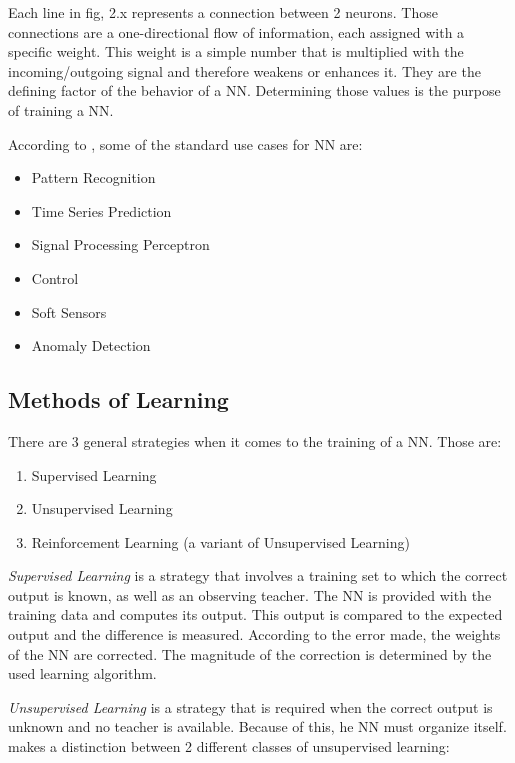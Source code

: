 Each line in fig, 2.x represents a connection between 2 neurons. Those connections are a one-directional flow of information, each assigned with a specific weight. This weight is a simple number that is multiplied with the incoming/outgoing signal and therefore weakens or enhances it. They are the defining factor of the behavior of a NN. Determining those values is the purpose of training a NN\cite{Bourg04}.

According to \cite{Shiffman12}, some of the standard use cases for NN are:

\begin{itemize}
	\item Pattern Recognition
	\item Time Series Prediction
	\item Signal Processing Perceptron
	\item Control
	\item Soft Sensors
	\item Anomaly Detection
\end{itemize}


\subsection{Methods of Learning}
There are 3 general strategies when it comes to the training of a NN\cite{Bourg04}. Those are:

\begin{enumerate}
	\item Supervised Learning
	\item Unsupervised Learning
	\item Reinforcement Learning (a variant of Unsupervised Learning\cite{Rojas96})
\end{enumerate}

\emph{Supervised Learning} is a strategy that involves a training set to which the correct output is known, as well as an observing teacher. The NN is provided with the training data and computes its output. This output is compared to the expected output and the difference is measured. According to the error made, the weights of the NN are corrected. The magnitude of the correction is determined by the used learning algorithm\cite{Rojas96}.

\emph{Unsupervised Learning} is a strategy that is required when the correct output is unknown and no teacher is available. Because of this, he NN must organize itself\cite{Shiffman12}. \cite{Rojas96} makes a distinction between 2 different classes of unsupervised learning:

